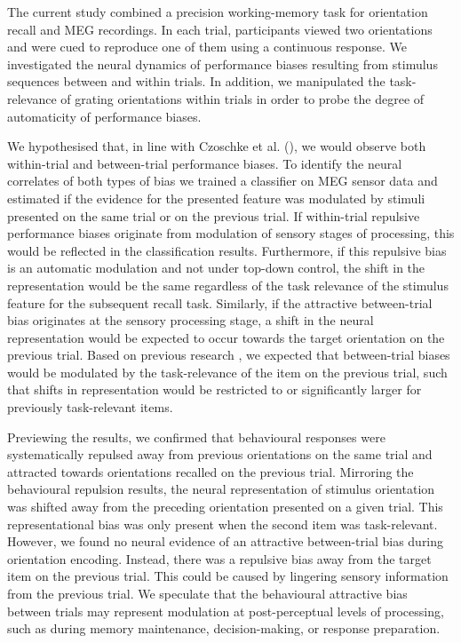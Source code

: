 \documentclass{article}
\begin{document}
The current study combined a precision working-memory task for orientation recall and MEG recordings. In each trial, participants viewed two orientations and were cued to reproduce one of them using a continuous response. We investigated the neural dynamics of performance biases resulting from stimulus sequences between and within trials. In addition, we manipulated the task-relevance of grating orientations within trials in order to probe the degree of automaticity of performance biases.

We hypothesised that, in line with Czoschke et al. (\citeyear{Czoschke2019}), we would observe both within-trial and between-trial performance biases. To identify the neural correlates of both types of bias we trained a classifier on MEG sensor data and estimated if the evidence for the presented feature was modulated by stimuli presented on the same trial or on the previous trial. If within-trial repulsive performance biases originate from modulation of sensory stages of processing, this would be reflected in the classification results. Furthermore, if this repulsive bias is an automatic modulation and not under top-down control, the shift in the representation would be the same regardless of the task relevance of the stimulus feature for the subsequent recall task. Similarly, if the attractive between-trial bias originates at the sensory processing stage, a shift in the neural representation would be expected to occur towards the target orientation on the previous trial. Based on previous research \parencite{Bae2020, Fischer2020}, we expected that between-trial biases would be modulated by the task-relevance of the item on the previous trial, such that shifts in representation would be restricted to or significantly larger for previously task-relevant items.

Previewing the results, we confirmed that behavioural responses were systematically repulsed away from previous orientations on the same trial and attracted towards orientations recalled on the previous trial. Mirroring the behavioural repulsion results, the neural representation of stimulus orientation was shifted away from the preceding orientation presented on a given trial. This representational bias was only present when the second item was task-relevant. However, we found no neural evidence of an attractive between-trial bias during orientation encoding. Instead, there was a repulsive bias away from the target item on the previous trial. This could be caused by lingering sensory information from the previous trial. We speculate that the behavioural attractive bias between trials may represent modulation at post-perceptual levels of processing, such as during memory maintenance, decision-making, or response preparation.
\end{document}
